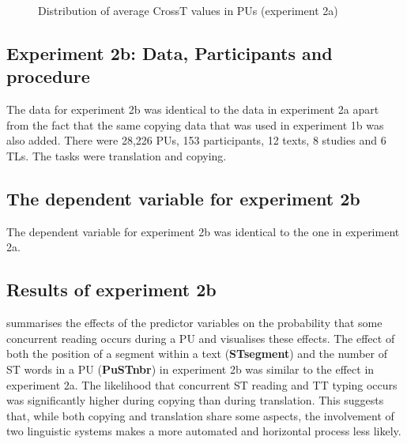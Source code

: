\documentclass[output=paper]{LSP/langsci}
\begin{document}
 
\begin{figure}
\caption{Distribution of average CrossT values in PUs (experiment 2a)}
\label{schaeffer-carl:fig:7}
\end{figure}

\subsection{Experiment 2b: Data, Participants and procedure}

The data for experiment 2b was identical to the data in experiment 2a apart from the fact that the same copying data that was used in experiment 1b was also added. There were 28,226 PUs, 153 participants, 12 texts, 8 studies and 6 TLs. The tasks were translation and copying.

\subsection{The dependent variable for experiment 2b}

The dependent variable for experiment 2b was identical to the one in experiment 2a.

\subsection{Results of experiment 2b}

 summarises the effects of the predictor variables on the probability that some concurrent reading occurs during a PU and  visualises these effects. The effect of both the position of a segment within a text (\textbf{STsegment}) and the number of ST words in a PU (\textbf{PuSTnbr}) in experiment 2b was similar to the effect in experiment 2a. The likelihood that concurrent ST reading and TT typing occurs was significantly higher during copying than during translation. This suggests that, while both copying and translation share some aspects, the involvement of two linguistic systems makes a more automated and horizontal process less likely.
\end{document}
